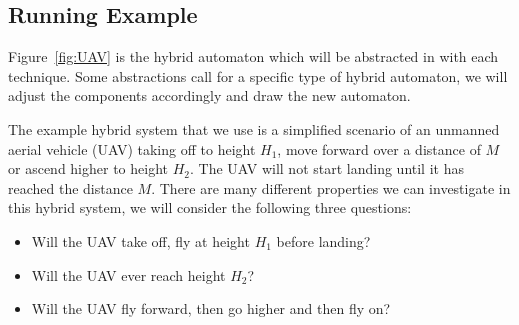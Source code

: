 \subsection{Running Example}
Figure~\ref{fig:UAV} is the hybrid automaton which will be abstracted in with each technique. Some abstractions call for a specific type of hybrid automaton, we will adjust the components accordingly and draw the new automaton.

The example hybrid system that we use is a simplified scenario of an unmanned aerial vehicle (UAV) taking off to height $H_{1}$, move forward over a distance of $M$ or ascend higher to height $H_{2}$. The UAV will not start landing until it has reached the distance $M$.
There are many different properties we can investigate in this hybrid system, we will consider the following three questions:
\begin{itemize}
    \item{Will the UAV take off, fly at height $H_{1}$ before landing?}
    \item{Will the UAV ever reach height $H_{2}$?}
    \item{Will the UAV fly forward, then go higher and then fly on?}
\end{itemize}
